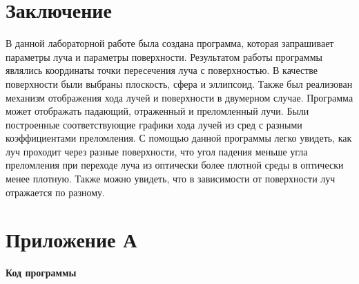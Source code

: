 \section*{Заключение}{
	В данной лабораторной работе была создана программа, которая запрашивает параметры луча и параметры поверхности. Результатом работы программы являлись координаты точки пересечения луча с поверхностью. В качестве поверхности были выбраны плоскость, сфера и эллипсоид. Также был реализован механизм отображения хода лучей и поверхности в двумерном случае. Программа может отображать падающий, отраженный и преломленный лучи. Были построенные соответствующие графики хода лучей из сред с разными коэффициентами преломления. С помощью данной программы легко увидеть, как луч проходит через разные поверхности, что угол падения меньше угла преломления при переходе луча из оптически более плотной среды в оптически менее плотную. Также можно увидеть, что в зависимости от поверхности луч отражается по разному.
}

\newpage


\section*{Приложение А}
{
	\begin{center}
	\textbf{Код программы}
	\end{center}
	
}


